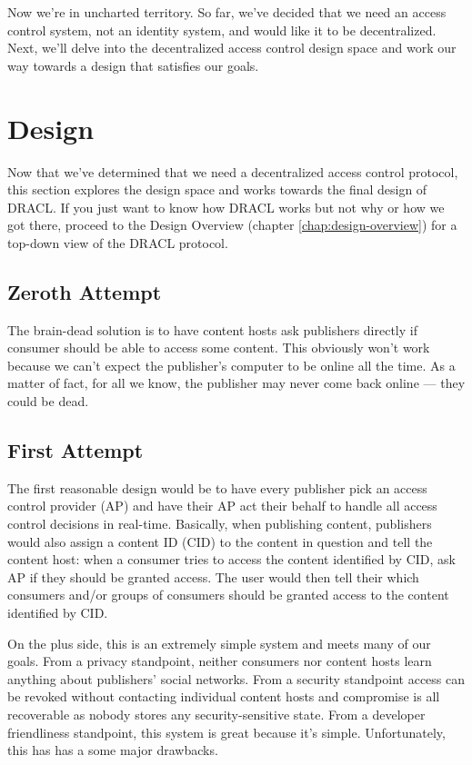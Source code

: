 \documentclass[pdftex,12pt,a4papaer]{report}
\begin{document}
Now we're in uncharted territory. So far, we've decided that we need an access
control system, not an identity system, and would like it to be decentralized.
Next, we'll delve into the decentralized access control design space and work
our way towards a design that satisfies our goals.

\section{Design}
\label{sec:design}

Now that we've determined that we need a decentralized access control protocol,
this section explores the design space and works towards the final design of
DRACL. If you just want to know how DRACL works but not why or how we got there,
proceed to the Design Overview (chapter \ref{chap:design-overview}) for a
top-down view of the DRACL protocol.

\subsection{Zeroth Attempt}

The brain-dead solution is to have content hosts ask publishers directly if
consumer should be able to access some content. This obviously won't work
because we can't expect the publisher's computer to be online all the time. As a
matter of fact, for all we know, the publisher may never come back online ---
they could be dead.

\subsection{First Attempt}

The first reasonable design would be to have every publisher pick an access
control provider (AP) and have their AP act their behalf to handle all access
control decisions in real-time. Basically, when publishing content, publishers
would also assign a content ID (CID) to the content in question and tell the
content host: when a consumer tries to access the content identified by CID, ask
AP if they should be granted access. The user would then tell their which
consumers and/or groups of consumers should be granted access to the content
identified by CID.

On the plus side, this is an extremely simple system and meets many of our
goals. From a privacy standpoint, neither consumers nor content hosts learn
anything about publishers' social networks. From a security standpoint access
can be revoked without contacting individual content hosts and compromise 
is all recoverable as nobody stores any security-sensitive state. From a
developer friendliness standpoint, this system is great because it's simple.
Unfortunately, this has has a some major drawbacks.
\end{document}
